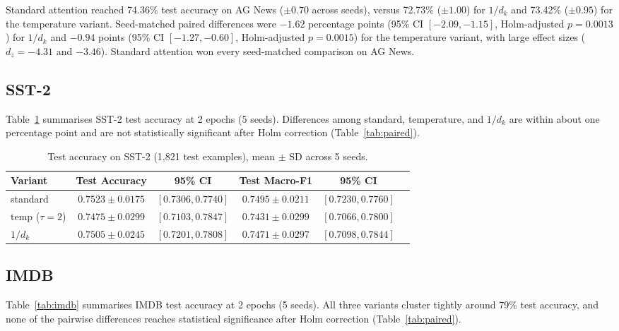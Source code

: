 \documentclass[10pt,a4paper]{article}
\begin{document}
Standard attention reached 74.36\% test accuracy on AG News ($\pm 0.70$ across seeds), versus 72.73\% ($\pm 1.00$) for $1/d_k$ and 73.42\% ($\pm 0.95$) for the temperature variant. Seed-matched paired differences were $-1.62$ percentage points (95\% CI $[-2.09,-1.15]$, Holm-adjusted $p=0.0013$) for $1/d_k$ and $-0.94$ points (95\% CI $[-1.27,-0.60]$, Holm-adjusted $p=0.0015$) for the temperature variant, with large effect sizes ($d_z=-4.31$ and $-3.46$). Standard attention won every seed-matched comparison on AG News.

\subsection{SST-2}

Table~\ref{tab:sst2} summarises SST-2 test accuracy at 2 epochs (5 seeds). Differences among standard, temperature, and $1/d_k$ are within about one percentage point and are not statistically significant after Holm correction (Table~\ref{tab:paired}).

\begin{table}[t]
\centering
\caption{Test accuracy on SST-2 (1,821 test examples), mean $\pm$ SD across 5 seeds.}\label{tab:sst2}
\small
\begin{tabular*}{\textwidth}{@{\extracolsep{\fill}} lccccc@{}}
\toprule
Variant & Test Accuracy & 95\% CI & Test Macro-F1 & 95\% CI \\
\midrule
standard & $0.7523 \pm 0.0175$ & $[0.7306, 0.7740]$ & $0.7495 \pm 0.0211$ & $[0.7230, 0.7760]$ \\
temp ($\tau{=}2$) & $0.7475 \pm 0.0299$ & $[0.7103, 0.7847]$ & $0.7431 \pm 0.0299$ & $[0.7066, 0.7800]$ \\
$1/d_k$ & $0.7505 \pm 0.0245$ & $[0.7201, 0.7808]$ & $0.7471 \pm 0.0297$ & $[0.7098, 0.7844]$ \\
\bottomrule
\end{tabular*}
\end{table}

\subsection{IMDB}

Table~\ref{tab:imdb} summarises IMDB test accuracy at 2 epochs (5 seeds). All three variants cluster tightly around 79\% test accuracy, and none of the pairwise differences reaches statistical significance after Holm correction (Table~\ref{tab:paired}).
\end{document}
